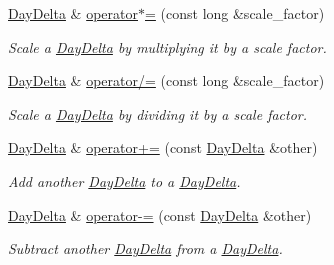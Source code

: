 \begin{DoxyCompactItemize}
\hyperlink{structDayDelta}{Day\-Delta} \& \hyperlink{structDayDelta_a91d89bf70ffbbe65b113e65272820362}{operator$\ast$=} (const long \&scale\-\_\-factor)
\begin{DoxyCompactList}\small\item\em Scale a \hyperlink{structDayDelta}{Day\-Delta} by multiplying it by a scale factor. \end{DoxyCompactList}\item 
\hyperlink{structDayDelta}{Day\-Delta} \& \hyperlink{structDayDelta_a2a4951095b765e2888a7ebd970e98b5f}{operator/=} (const long \&scale\-\_\-factor)
\begin{DoxyCompactList}\small\item\em Scale a \hyperlink{structDayDelta}{Day\-Delta} by dividing it by a scale factor. \end{DoxyCompactList}\item 
\hyperlink{structDayDelta}{Day\-Delta} \& \hyperlink{structDayDelta_a081325e9acba450f7446d1d59ed65518}{operator+=} (const \hyperlink{structDayDelta}{Day\-Delta} \&other)
\begin{DoxyCompactList}\small\item\em Add another \hyperlink{structDayDelta}{Day\-Delta} to a \hyperlink{structDayDelta}{Day\-Delta}. \end{DoxyCompactList}\item 
\hyperlink{structDayDelta}{Day\-Delta} \& \hyperlink{structDayDelta_a886f81ff8427ad7712a246fcd3b139f7}{operator-\/=} (const \hyperlink{structDayDelta}{Day\-Delta} \&other)
\begin{DoxyCompactList}\small\item\em Subtract another \hyperlink{structDayDelta}{Day\-Delta} from a \hyperlink{structDayDelta}{Day\-Delta}. \end{DoxyCompactList}\end{DoxyCompactItemize}

